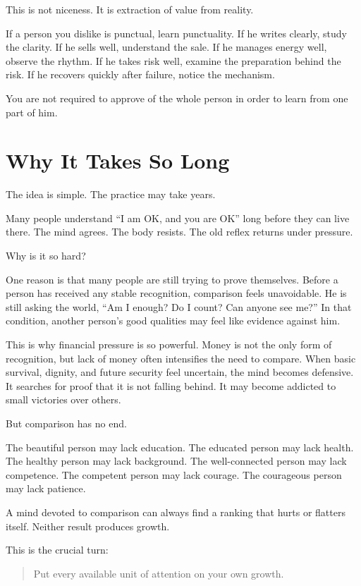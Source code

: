 This is not niceness. It is extraction of value from reality.

If a person you dislike is punctual, learn punctuality. If he writes clearly, study the clarity. If he sells well, understand the sale. If he manages energy well, observe the rhythm. If he takes risk well, examine the preparation behind the risk. If he recovers quickly after failure, notice the mechanism.

You are not required to approve of the whole person in order to learn from one part of him.

\section*{Why It Takes So Long}

The idea is simple. The practice may take years.

Many people understand ``I am OK, and you are OK'' long before they can live there. The mind agrees. The body resists. The old reflex returns under pressure.

Why is it so hard?

One reason is that many people are still trying to prove themselves. Before a person has received any stable recognition, comparison feels unavoidable. He is still asking the world, ``Am I enough? Do I count? Can anyone see me?'' In that condition, another person's good qualities may feel like evidence against him.

This is why financial pressure is so powerful. Money is not the only form of recognition, but lack of money often intensifies the need to compare. When basic survival, dignity, and future security feel uncertain, the mind becomes defensive. It searches for proof that it is not falling behind. It may become addicted to small victories over others.

But comparison has no end.

The beautiful person may lack education. The educated person may lack health. The healthy person may lack background. The well-connected person may lack competence. The competent person may lack courage. The courageous person may lack patience.

A mind devoted to comparison can always find a ranking that hurts or flatters itself. Neither result produces growth.

This is the crucial turn:

\begin{quote}
Put every available unit of attention on your own growth.
\end{quote}


